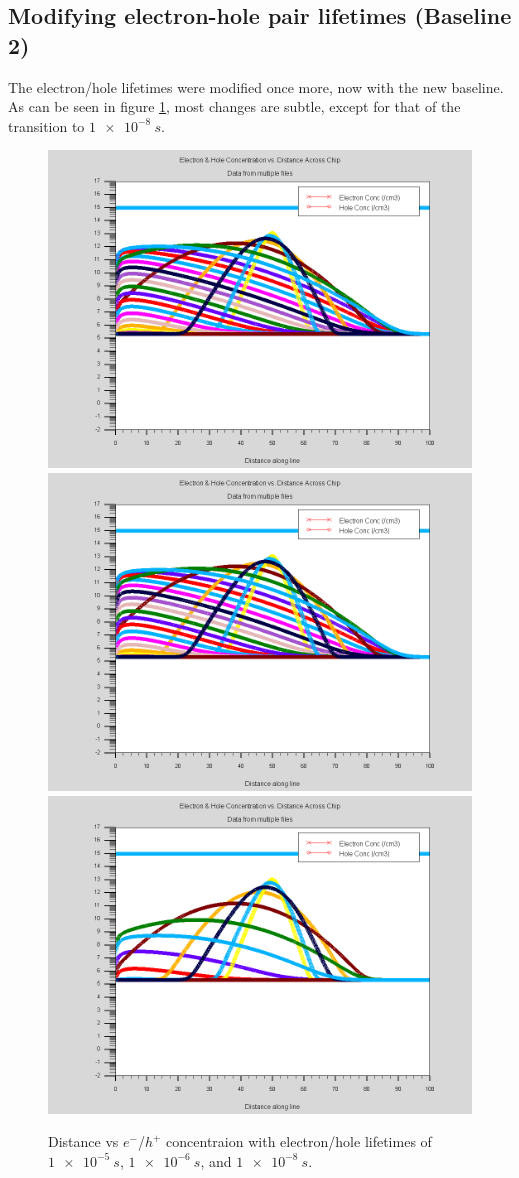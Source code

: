 \documentclass[12pt]{article}
\begin{document}
  \subsection{Modifying electron-hole pair lifetimes (Baseline 2)}
  The electron/hole lifetimes were modified once more, now with the new baseline. As can be seen in figure \ref{fig:distancevcurrent_lifetime_2}, most changes are subtle, except for that of the transition to $\SI{1e-8}{s}$.

  \begin{figure}[htp]
    \centering
    \includegraphics[width=.3\textwidth]{lifetime_2_after1e-005s}\hfill
    \includegraphics[width=.3\textwidth]{lifetime_2_after1e-006s}\hfill
    \includegraphics[width=.3\textwidth]{lifetime_2_after1e-008s}
    \caption{Distance vs $e^-$/$h^+$ concentraion with electron/hole lifetimes of $\SI{1e-5}{s}$, $\SI{1e-6}{s}$, and $\SI{1e-8}{s}$.}
    \label{fig:distancevcurrent_lifetime_2}
  \end{figure}
\end{document}
